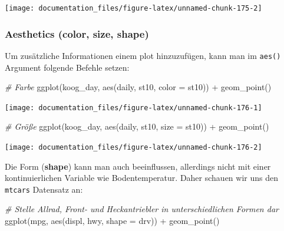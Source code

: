 \documentclass[
]{article}
\newenvironment{Shaded}{\begin{snugshade}}{\end{snugshade}}
\newcommand{\AttributeTok}[1]{\textcolor[rgb]{0.77,0.63,0.00}{#1}}
\newcommand{\CommentTok}[1]{\textcolor[rgb]{0.56,0.35,0.01}{\textit{#1}}}
\newcommand{\FunctionTok}[1]{\textcolor[rgb]{0.00,0.00,0.00}{#1}}
\newcommand{\NormalTok}[1]{#1}
\newcommand{\SpecialCharTok}[1]{\textcolor[rgb]{0.00,0.00,0.00}{#1}}
\begin{document}
\begin{center}\texttt{[image: documentation\_files/figure-latex/unnamed-chunk-175-2]} \end{center}

\hypertarget{aesthetics-color-size-shape}{%
\subsubsection{Aesthetics (color, size, shape)}\label{aesthetics-color-size-shape}}

Um zusätzliche Informationen einem plot hinzuzufügen, kann man im \texttt{aes()} Argument folgende Befehle setzen:

\begin{Shaded}
\begin{Highlighting}[]
\CommentTok{\# Farbe}
\FunctionTok{ggplot}\NormalTok{(koog\_day, }\FunctionTok{aes}\NormalTok{(daily, st10, }\AttributeTok{color =}\NormalTok{ st10)) }\SpecialCharTok{+}
  \FunctionTok{geom\_point}\NormalTok{()}
\end{Highlighting}
\end{Shaded}

\begin{center}\texttt{[image: documentation\_files/figure-latex/unnamed-chunk-176-1]} \end{center}

\begin{Shaded}
\begin{Highlighting}[]
\CommentTok{\# Größe}
\FunctionTok{ggplot}\NormalTok{(koog\_day, }\FunctionTok{aes}\NormalTok{(daily, st10, }\AttributeTok{size =}\NormalTok{ st10)) }\SpecialCharTok{+}
  \FunctionTok{geom\_point}\NormalTok{()}
\end{Highlighting}
\end{Shaded}

\begin{center}\texttt{[image: documentation\_files/figure-latex/unnamed-chunk-176-2]} \end{center}

Die Form (\textbf{shape}) kann man auch beeinflussen, allerdings nicht mit einer kontinuierlichen Variable wie Bodentemperatur. Daher schauen wir uns den \texttt{mtcars} Datensatz an:

\begin{Shaded}
\begin{Highlighting}[]
\CommentTok{\# Stelle Allrad, Front{-} und Heckantriebler in unterschiedlichen Formen dar}
\FunctionTok{ggplot}\NormalTok{(mpg, }\FunctionTok{aes}\NormalTok{(displ, hwy, }\AttributeTok{shape =}\NormalTok{ drv)) }\SpecialCharTok{+} 
  \FunctionTok{geom\_point}\NormalTok{()}
\end{Highlighting}
\end{Shaded}
\end{document}

